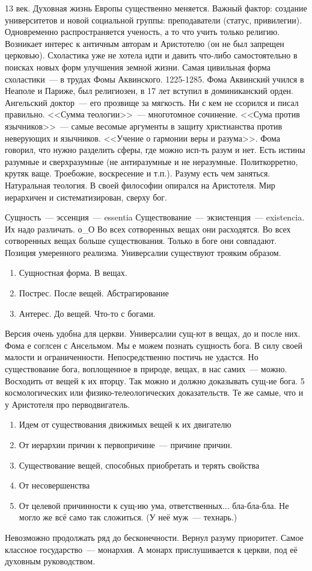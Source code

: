 13 век. Духовная жизнь Европы существенно меняется. Важный фактор: создание университетов и новой социальной группы: преподаватели (статус, привилегии). Одновременно распространяется ученость, а то что учить только религию. Возникает интерес к античным авторам и Аристотелю (он не был запрещен церковью). Схоластика уже не хотела идти и давить что-либо самостоятельно в поисках новых форм улучшения земной жизни. Самая цивильная форма схоластики~--- в трудах Фомы Аквинского. 1225-1285. Фома Аквинский учился в Неаполе и Париже, был религиозен, в 17 лет вступил в доминиканский орден. Ангельский доктор~--- его прозвище за мягкость. Ни с кем не ссорился и писал правильно. <<Сумма теологии>>~--- многотомное сочинение. <<Сума против язычников>>~--- самые весомые аргументы в защиту христианства против неверующих и язычников. <<Учение о гармонии веры и разума>>. Фома говорил, что нужно разделить сферы, где можно исп-ть разум и нет. Есть истины разумные и сверхразумные (не антиразумные и не неразумные. Политкорретно, крутяк ваще. Троебожие, воскресение и т.п.). Разуму есть чем заняться. Натуральная теология. В своей философии опирался на Аристотеля. Мир иерархичен и систематизирован, сверху бог.

Сущность~--- эссенция~--- essentia
Существование~--- экзистенция~--- existencia. Их надо различать. о_О
Во всех сотворенных вещах они расходятся. Во всех сотворенных вещах больше существования. Только в боге они совпадают. Позиция умеренного реализма. Универсалии существуют трояким образом.

\begin{enumerate}
	\item Сущностная форма. В вещах.
	\item Пострес. После вещей. Абстрагирование
	\item Антерес. До вещей. Что-то с богами.
\end{enumerate}Версия очень удобна для церкви. Универсалии сущ-ют в вещах, до и после них.
Фома е соглсен с Ансельмом. Мы е можем познать сущность бога. В силу своей малости и ограниченности. Непосредственно постичь не удастся. Но существование бога, воплощенное в природе, вещах, в нас самих~--- можно. Восходить от вещей к их вторцу. Так можно и должно доказывать сущ-ие бога. 5 космологических или физико-телеологических доказательств. Те же самые, что и у Аристотеля про перводвигатель.

\begin{enumerate}
	\item Идем от существования движимых вещей к их двигателю
	\item От иерархии причин к первопричине~--- причине причин.
	\item Существование вещей, способных приобретать и терять свойства
	\item От несовершенства
	\item От целевой причинности к сущ-ию ума, ответственных... бла-бла-бла. Не могло же всё само так сложиться. (У неё муж~--- технарь.)
\end{enumerate}
Невозможно продолжать ряд до бесконечности.
Вернул разуму приоритет.
Самое классное государство~--- монархия. А монарх прислушивается к церкви, под её духовным руководством.


